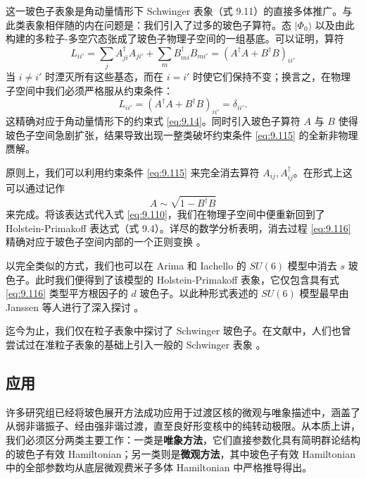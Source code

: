 这一玻色子表象是角动量情形下 Schwinger 表象（式 9.11）的直接多体推广。与此类表象相伴随的内在问题是：我们引入了过多的玻色子算符。态
$|\Phi_{0})$ 以及由此构建的多粒子-多空穴态张成了玻色子物理子空间的一组基底。可以证明，算符
\begin{equation}
L_{ii'}=\sum_{j}A^{\dagger}_{ji}A_{ji'}+\sum_{m}B^{\dagger}_{mi}B_{mi'}=(A^{\dagger}A+B^{\dagger}B)_{ii'}\label{eq:9.114}
\end{equation}
当 $i\ne i'$ 时湮灭所有这些基态，而在 $i=i'$ 时使它们保持不变；换言之，在物理子空间中我们必须严格服从约束条件：
\begin{equation}
L_{ii'}=(A^{\dagger}A+B^{\dagger}B)_{ii'}=\delta_{ii'}.\label{eq:9.115}
\end{equation}
这精确对应于角动量情形下的约束式 \ref{eq:9.14}。同时引入玻色子算符 $A$ 与 $B$ 使得玻色子空间急剧扩张，结果导致出现一整类破坏约束条件
\ref{eq:9.115} 的全新非物理赝解。

原则上，我们可以利用约束条件 \ref{eq:9.115} 来完全消去算符 $A_{ij},A^{\dagger}_{ij}$。在形式上这可以通过记作
\begin{equation}
A\sim\sqrt{1-B^{\dagger}B}\label{eq:9.116}
\end{equation}
来完成。将该表达式代入式 \ref{eq:9.110}，我们在物理子空间中便重新回到了 Holstein-Primakoff 表达式（式
9.4）。详尽的数学分析表明，消去过程 \ref{eq:9.116} 精确对应于玻色子空间内部的一个正则变换 \cite{BM78}。

以完全类似的方式，我们也可以在 Arima 和 Iachello 的 $SU(6)$ 模型中消去 $s$ 玻色子。此时我们便得到了该模型的
Holstein-Primakoff 表象，它仅包含具有式 \ref{eq:9.116} 类型平方根因子的 $d$ 玻色子。以此种形式表述的
$SU(6)$ 模型最早由 Janssen 等人进行了深入探讨 \cite{JJD74}。

迄今为止，我们仅在粒子表象中探讨了 Schwinger 玻色子。在文献中，人们也曾尝试过在准粒子表象的基础上引入一般的 Schwinger
表象 \cite{YN76,MNY77,FYN77,Fu77}。

\subsection{应用\label{subsec:9.2.8_=005E94=007528}}

许多研究组已经将玻色展开方法成功应用于过渡区核的微观与唯象描述中，涵盖了从弱非谐振子、经由强非谐过渡，直至良好形变核中的纯转动极限。从本质上讲，我们必须区分两类主要工作：一类是\textbf{唯象方法}，它们直接参数化具有简明群论结构的玻色子有效
Hamiltonian；另一类则是\textbf{微观方法}，其中玻色子有效 Hamiltonian 中的全部参数均从底层微观费米子多体
Hamiltonian 中严格推导得出。

